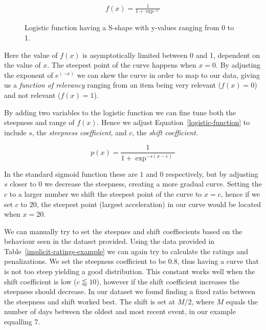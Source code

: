 \begin{figure}[H]
  \centering
  \noindent\begin{minipage}{.45\textwidth}
  \end{minipage}
  \begin{minipage}{.45\textwidth}
  \begin{align}
    \label{logistic-function}
    f(x) = \frac{1}{1+\exp^{-x}}
  \end{align}
  \end{minipage}
  \caption{Logistic function having a S-shape with y-values ranging
  from 0 to 1.}
\end{figure}

Here the value of $f(x)$ is asymptotically limited between 0 and 1, dependent
on the value of $x$. The steepest point of the curve happens when $x=0$. By
adjusting the exponent of $e^{(-x)}$ we can skew the curve in order to map to our
data, giving us a \textit{function of relevancy} ranging from an item being
very relevant ($f(x)=0$) and not relevant ($f(x)=1$).

By adding two variables to the logistic function we can fine tune both the
steepness and range of $f(x)$. Hence we adjust Equation~\ref{logistic-function}
to include $s$, the \textit{steepness coefficient}, and $c$, the \textit{shift
coefficient}.

\begin{equation}
  p(x) = \frac{1}{1+\exp^{-s(x - c)}}
\end{equation}

In the standard sigmoid function these are $1$ and $0$ respectively, but by
adjusting $s$ closer to 0 we decrease the steepness, creating a more gradual
curve. Setting the $c$ to a larger number we shift the steepest point of the
curve to $x=c$, hence if we set $c$ to $20$, the steepest point (largest
acceleration) in our curve would be located when $x=20$.

We can manually try to set the steepnes and shift coeffiecients based on the
behaviour seen in the dataset provided. Using the data provided in
Table~\ref{implicit-ratings-example} we can again try to calculate the ratings
and penalizations. We set the steepness coefficient to be $0.8$, thus having a
curve that is not too steep yielding a good distribution. This constant works
well when the shift coefficient is low ($c \lessapprox 10$), however if the
shift coefficient increases the steepness should decrease. In our dataset we
found finding a fixed ratio between the steepness and shift worked best. The
shift is set at $M/2$, where $M$ equals the number of days between the oldest
and most recent event, in our example equalling 7.

